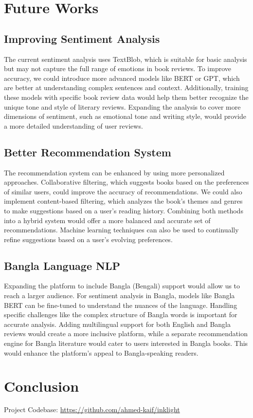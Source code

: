 \section{Future Works}

\subsection{Improving Sentiment Analysis}
The current sentiment analysis uses TextBlob, which is suitable for basic analysis but may not capture the full range of emotions in book reviews. To improve accuracy, we could introduce more advanced models like BERT or GPT, which are better at understanding complex sentences and context. Additionally, training these models with specific book review data would help them better recognize the unique tone and style of literary reviews. Expanding the analysis to cover more dimensions of sentiment, such as emotional tone and writing style, would provide a more detailed understanding of user reviews.

\subsection{Better Recommendation System}
The recommendation system can be enhanced by using more personalized approaches. Collaborative filtering, which suggests books based on the preferences of similar users, could improve the accuracy of recommendations. We could also implement content-based filtering, which analyzes the book's themes and genres to make suggestions based on a user’s reading history. Combining both methods into a hybrid system would offer a more balanced and accurate set of recommendations. Machine learning techniques can also be used to continually refine suggestions based on a user’s evolving preferences.

\subsection{Bangla Language NLP}
Expanding the platform to include Bangla (Bengali) support would allow us to reach a larger audience. For sentiment analysis in Bangla, models like Bangla BERT can be fine-tuned to understand the nuances of the language. Handling specific challenges like the complex structure of Bangla words is important for accurate analysis. Adding multilingual support for both English and Bangla reviews would create a more inclusive platform, while a separate recommendation engine for Bangla literature would cater to users interested in Bangla books. This would enhance the platform’s appeal to Bangla-speaking readers.
\section{Conclusion}
Project Codebase:
\url{https://github.com/ahmed-kaif/inklight}
